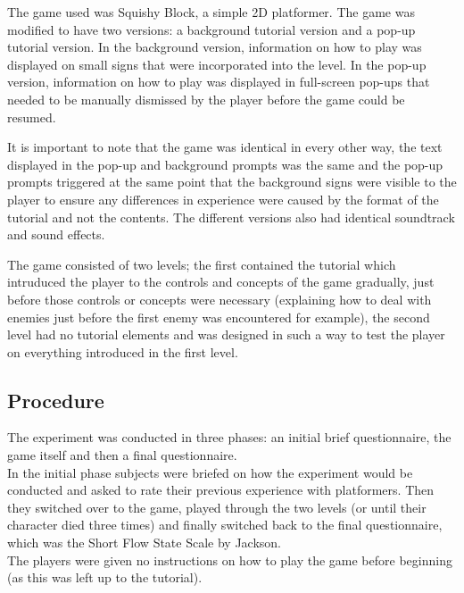 \documentclass{acmsiggraph}
\begin{document}
The game used was Squishy Block, a simple 2D platformer. The game was modified to have two versions: a background tutorial version and a pop-up tutorial version.
In the background version, information on how to play was displayed on small signs that were incorporated into the level. In the pop-up version, information on how to play was displayed in full-screen pop-ups that needed to be manually dismissed by the player before the game could be resumed.

It is important to note that the game was identical in every other way, the text displayed in the pop-up and background prompts was the same and the pop-up prompts triggered at the same point that the background signs were visible to the player to ensure any differences in experience were caused by the format of the tutorial and not the contents. The different versions also had identical soundtrack and sound effects.

The game consisted of two levels; the first contained the tutorial which intruduced the player to the controls and concepts of the game gradually, just before those controls or concepts were necessary (explaining how to deal with enemies just before the first enemy was encountered for example), the second level had no tutorial elements and was designed in such a way to test the player on everything introduced in the first level.

\subsection{Procedure}
The experiment was conducted in three phases: an initial brief questionnaire, the game itself and then a final questionnaire.\\
In the initial phase subjects were briefed on how the experiment would be conducted and asked to rate their previous experience with platformers. Then they switched over to the game, played through the two levels (or until their character died three times) and finally switched back to the final questionnaire, which was the Short Flow State Scale by Jackson.\\
The players were given no instructions on how to play the game before beginning (as this was left up to the tutorial).


\end{document}
